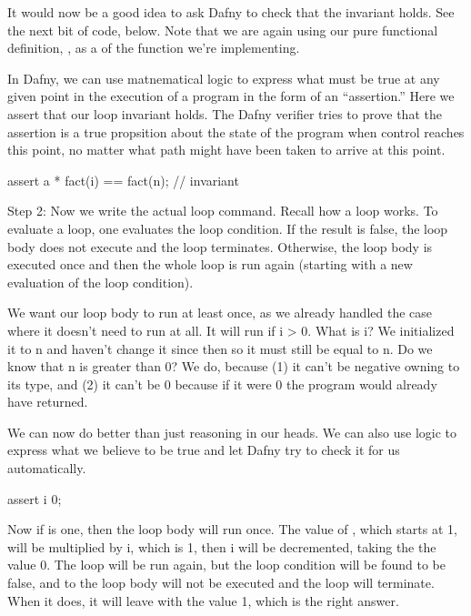 \documentclass[letterpaper,10pt,english]{sphinxmanual}
\begin{document}
It would now be a good idea to ask Dafny to check that the invariant
holds. See the next bit of code, below. Note that we are again using
our pure functional definition, , as a  of the
function we’re implementing.

In Dafny, we can use matnematical logic to express what must be true
at any given point in the execution of a program in the form of an
“assertion.” Here we assert that our loop invariant holds. The Dafny
verifier tries to prove that the assertion is a true propsition about
the state of the program when control reaches this point, no matter
what path might have been taken to arrive at this point.

\begin{sphinxVerbatim}[commandchars=\\\{\}]
assert a * fact(i) == fact(n); // \PYGZdq{}invariant\PYGZdq{}
\end{sphinxVerbatim}

Step 2: Now we write the actual loop command. Recall how a 
loop works. To evaluate a loop, one evaluates the loop condition. If
the result is false, the loop body does not execute and the loop
terminates.  Otherwise, the loop body is executed once and then the
whole loop is run again (starting with a new evaluation of the loop
condition).

We want our loop body to run at least once, as we already handled the
case where it doesn’t need to run at all. It will run if i \textgreater{} 0. What
is i? We initialized it to n and haven’t change it since then so it
must still be equal to n. Do we know that n is greater than 0? We do,
because (1) it can’t be negative owning to its type, and (2) it can’t
be 0 because if it were 0 the program would already have returned.

We can now do better than just reasoning in our heads. We can also use
logic to express what we believe to be true and let Dafny try to check
it for us automatically.

\begin{sphinxVerbatim}[commandchars=\\\{\}]
assert i \PYGZgt{} 0;
\end{sphinxVerbatim}

Now if  is one, then the loop body will run once. The value of ,
which starts at 1, will be multiplied by i, which is 1, then i will be
decremented, taking the the value 0. The loop will be run again, but
the loop condition will be found to be false, and to the loop body
will not be executed and the loop will terminate. When it does, it
will leave  with the value 1, which is the right answer.
\end{document}
